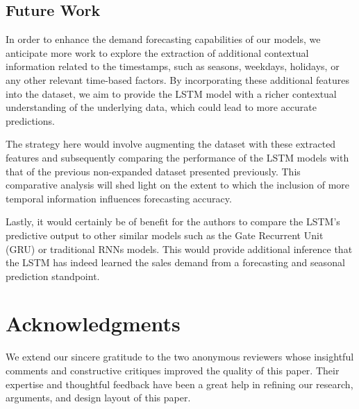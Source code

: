 \documentclass[10pt, conference, compsoc]{IEEEtran}
\begin{document}
\subsection{Future Work}
In order to enhance the demand forecasting capabilities of our models, we anticipate more work to explore the extraction of additional contextual information related to the timestamps, such as seasons, weekdays, holidays, or any other relevant time-based factors. By incorporating these additional features into the dataset, we aim to provide the LSTM model with a richer contextual understanding of the underlying data, which could lead to more accurate predictions.

The strategy here would involve augmenting the dataset with these extracted features and subsequently comparing the performance of the LSTM models with that of the previous non-expanded dataset presented previously. This comparative analysis will shed light on the extent to which the inclusion of more temporal information influences forecasting accuracy.

Lastly, it would certainly be of benefit for the authors to compare the LSTM's predictive output to other similar models such as the Gate Recurrent Unit (GRU) or traditional RNNs models. This would provide additional inference that the LSTM has indeed learned the sales demand from a forecasting and seasonal prediction standpoint.

\clearpage
\section*{Acknowledgments}
We extend our sincere gratitude to the two anonymous reviewers whose insightful comments and constructive critiques improved the quality of this paper. Their expertise and thoughtful feedback have been a great help in refining our research, arguments, and design layout of this paper.


\printbibliography %
\end{document}
